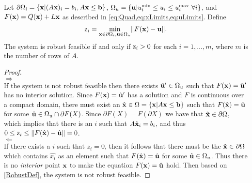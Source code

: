   \medskip
\begin{thm} \label{thm:RobFeas}
  Let $\partial\Omega_i=\{\mathbf{x}| (A\mathbf{x})_i = b_i, A\mathbf{x}\leq \mathbf{b}\}$, $\Omega_{u}=\{\mathbf{u}| u^{\min}_i\leq u_i \leq u^{\max}_i \ \forall i \}$, and $F(\mathbf{x})=Q(\mathbf{x})+L\mathbf{x}$ as described in \cref{eq:Quad,eq:xLimits,eq:uLimits}.
  Define
  \begin{align}
    \mathrm{z}_i =  \min_{\mathbf{x}\in\partial\Omega_i, \mathbf{u} \in \Omega_u} \lVert F(\mathbf{x})-\mathbf{u}\rVert. \label{eq:OPTfeas}
  \end{align}
  The system is robust feasible if and only if $\mathrm{z}_i>0$ for each $i = 1, \ldots, m$, where $m$ is the number of rows of $A$.

  \begin{proof} \ \\
    $\boxed{\Rightarrow}$ \\ 
    If the system is not robust feasible then there exists $\hat{\mathbf{u}}'\in \Omega_u$ such that $F(\mathbf{x})=\hat{\mathbf{u}}'$ has no interior solution. 
    Since $F(\mathbf{x})=\hat{\mathbf{u}}'$ has a solution and $F$ is continuous over a compact domain, there must exist an $\hat{\mathbf{x}} \in \Omega = \{\mathbf{x}| A\mathbf{x} \leq \mathbf{b}\}$ such that $F(\hat{\mathbf{x}})=\hat{\mathbf{u}}$ for some $\hat{\mathbf{u}}\in \Omega_u\cap \partial F(X)$. 
    Since $\partial F(X) = F(\partial X)$ we have that $\hat{\mathbf{x}}\in\partial\Omega$, which implies that there is an $i$ such that $A\hat{\mathbf{x}}_i=b_i$, and thus $0 \leq \mathrm{z}_i \leq \lVert F(\hat{\mathbf{x}})-\hat{\mathbf{u}}\rVert=0$.\\
    $\boxed{\Leftarrow}$ \\ 
    If there exists a $i$ such that $z_i=0$, then it follows that there must be the $\hat{\mathbf{x}}\in \partial \Omega$ which contains $\hat{x_i}$ as an element such that $F(\hat{\mathbf{x}})=\hat{\mathbf{u}}$ for some $\hat{\mathbf{u}}\in \Omega_u$.
    Thus there is no \emph{interior} point $\mathbf{x}$ to make the equation $F(\mathbf{x})=\hat{\mathbf{u}}$ hold.
    Then based on \cref{RobustDef}, the system is not robust feasible. 
  \end{proof}
\end{thm}


